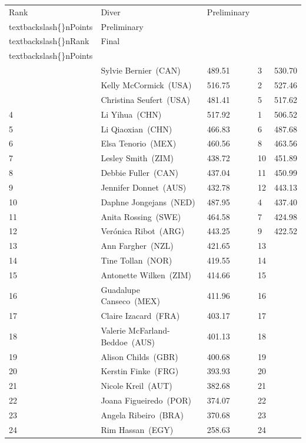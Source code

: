 \documentclass{article}
\begin{document}
\begin{tabular}{lllll}
\toprule
Rank & Diver & Preliminary\\textbackslash\{\}nPoints & Preliminary\\textbackslash\{\}nRank & Final\\textbackslash\{\}nPoints \\
\midrule
 & Sylvie Bernier (CAN) & 489.51 & 3 & 530.70 \\
 & Kelly McCormick (USA) & 516.75 & 2 & 527.46 \\
 & Christina Seufert (USA) & 481.41 & 5 & 517.62 \\
4 & Li Yihua (CHN) & 517.92 & 1 & 506.52 \\
5 & Li Qiaoxian (CHN) & 466.83 & 6 & 487.68 \\
6 & Elsa Tenorio (MEX) & 460.56 & 8 & 463.56 \\
7 & Lesley Smith (ZIM) & 438.72 & 10 & 451.89 \\
8 & Debbie Fuller (CAN) & 437.04 & 11 & 450.99 \\
9 & Jennifer Donnet (AUS) & 432.78 & 12 & 443.13 \\
10 & Daphne Jongejans (NED) & 487.95 & 4 & 437.40 \\
11 & Anita Rossing (SWE) & 464.58 & 7 & 424.98 \\
12 & Verónica Ribot (ARG) & 443.25 & 9 & 422.52 \\
13 & Ann Fargher (NZL) & 421.65 & 13 &  \\
14 & Tine Tollan (NOR) & 419.55 & 14 &  \\
15 & Antonette Wilken (ZIM) & 414.66 & 15 &  \\
16 & Guadalupe Canseco (MEX) & 411.96 & 16 &  \\
17 & Claire Izacard (FRA) & 403.17 & 17 &  \\
18 & Valerie McFarland-Beddoe (AUS) & 401.13 & 18 &  \\
19 & Alison Childs (GBR) & 400.68 & 19 &  \\
20 & Kerstin Finke (FRG) & 393.93 & 20 &  \\
21 & Nicole Kreil (AUT) & 382.68 & 21 &  \\
22 & Joana Figueiredo (POR) & 374.07 & 22 &  \\
23 & Angela Ribeiro (BRA) & 370.68 & 23 &  \\
24 & Rim Hassan (EGY) & 258.63 & 24 &  \\
\bottomrule
\end{tabular}
\end{document}

